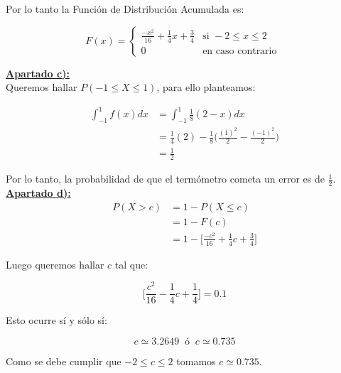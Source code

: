 \documentclass[11pt]{article}
\begin{document}
Por lo tanto la Función de Distribución Acumulada es:

\[
  F(x) = \begin{cases}
    \frac{-x^2}{16} + \frac{1}{4}x + \frac{3}{4} & \text{si }  -2 \leq x \leq 2 \\
    0                  & \text{en caso contrario }
  \end{cases}
\]

\newpage

\textbf{\underline{Apartado c):}} \\

Queremos hallar $ P(-1 \leq X \leq 1) $, para ello planteamos:

\begin{align*}
  \int_{-1}^{1} f(x)dx & = \int_{-1}^{1} \frac{1}{8} (2-x) dx                                          \\
                       & = \frac{1}{4}(2) - \frac{1}{8} \Big( \frac{(1)^2}{2} - \frac{(-1)^2}{2} \Big) \\
                       & = \frac{1}{2}
\end{align*}

Por lo tanto, la probabilidad de que el termómetro cometa un error es de $\frac{1}{2}$. \\

\textbf{\underline{Apartado d):}} \\

\begin{align*}
  P(X > c) & = 1 - P(X \leq c)                                             \\
           & = 1 - F(c)                                                    \\
           & = 1 - \Big[\frac{-c^2}{16} + \frac{1}{4}c + \frac{3}{4} \Big]
\end{align*}

Luego queremos hallar $c$ tal que:

\begin{equation*}
  \Big[\frac{c^2}{16} - \frac{1}{4}c + \frac{1}{4} \Big] = 0.1
\end{equation*}

Esto ocurre sí y sólo sí:

\begin{equation*}
  c \simeq 3.2649 \; \; \text{ó} \; \; c \simeq 0.735
\end{equation*}

Como se debe cumplir que $-2 \leq c \leq 2$ tomamos $c \simeq 0.735$. \\
\end{document}
